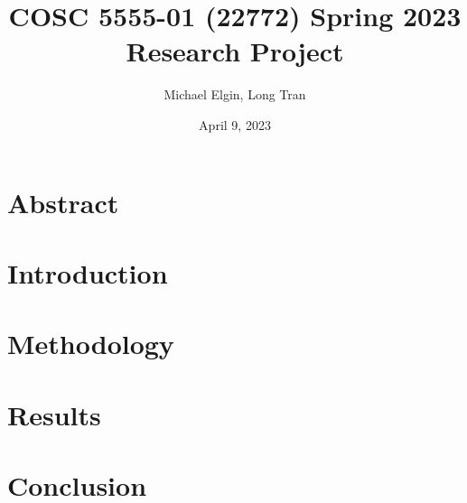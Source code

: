 \documentclass[12pt, letterpaper]{article}
\title{COSC 5555-01 (22772) Spring 2023 Research Project}
\author{Michael Elgin, Long Tran}
\date{April 9, 2023}
\begin{document}
\maketitle

\section{Abstract}
\section{Introduction}
\section{Methodology}
\section{Results}
\section{Conclusion}
\end{document}
